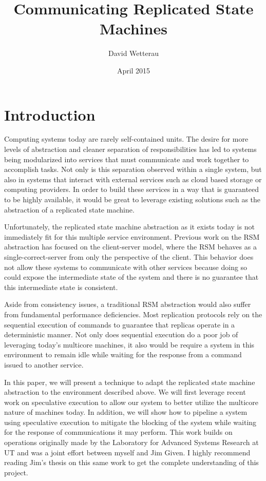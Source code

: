 \documentclass[11pt, oneside]{report}
\title{Communicating Replicated State Machines}
\author{David Wetterau}
\date{April 2015}
\begin{document}
\maketitle

\tableofcontents

\chapter{Introduction}
Computing systems today are rarely self-contained units. The desire for more levels of abstraction and cleaner separation of responsibilities has led to systems being modularized into services that must communicate and work together to accomplish tasks. Not only is this separation observed within a single system, but also in systems that interact with external services such as cloud based storage or computing providers. In order to build these services in a way that is guaranteed to be highly available, it would be great to leverage existing solutions such as the abstraction of a replicated state machine.

Unfortunately, the replicated state machine abstraction as it exists today is not immediately fit for this multiple service environment. Previous work on the RSM abstraction has focused on the client-server model, where the RSM behaves as a single-correct-server from only the perspective of the client. This behavior does not allow these systems to communicate with other services because doing so could expose the intermediate state of the system and there is no guarantee that this intermediate state is consistent.

Aside from consistency issues, a traditional RSM abstraction would also suffer from fundamental performance deficiencies. Most replication protocols rely on the sequential execution of commands to guarantee that replicas operate in a deterministic manner. Not only does sequential execution do a poor job of leveraging today’s multicore machines, it also would be require a system in this environment to remain idle while waiting for the response from a command issued to another service.

In this paper, we will present a technique to adapt the replicated state machine abstraction to the environment described above. We will first leverage recent work on speculative execution to allow our system to better utilize the multicore nature of machines today. In addition, we will show how to pipeline a system using speculative execution to mitigate the blocking of the system while waiting for the response of communications it may perform. This work builds on operations originally made by the Laboratory for Advanced Systems Research at UT and was a joint effort between myself and Jim Given. I highly recommend reading Jim’s thesis on this same work to get the complete understanding of this project.
\end{document}

